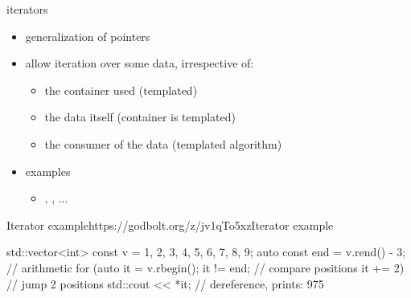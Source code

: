 \begin{frame}[fragile]
  \begin{block}{iterators}
    \begin{itemize}
    \item generalization of pointers
    \item allow iteration over some data, irrespective of:
      \begin{itemize}
      \item the container used (templated)
      \item the data itself (container is templated)
      \item the consumer of the data (templated algorithm)
      \end{itemize}
    \item examples
      \begin{itemize}
        \item {}, , ...
      \end{itemize}
    \end{itemize}
  \end{block}
  \begin{exampleblockGB}{Iterator example}{https://godbolt.org/z/jv1qTo5xz}{Iterator example}
    \begin{cppcode*}{}
      std::vector<int> const v = {1, 2, 3, 4, 5, 6, 7, 8, 9};
      auto const end = v.rend() - 3; // arithmetic
      for (auto it = v.rbegin();
           it != end;     // compare positions
           it += 2)       // jump 2 positions
        std::cout << *it; // dereference, prints: 975
    \end{cppcode*}
  \end{exampleblockGB}
\end{frame}

